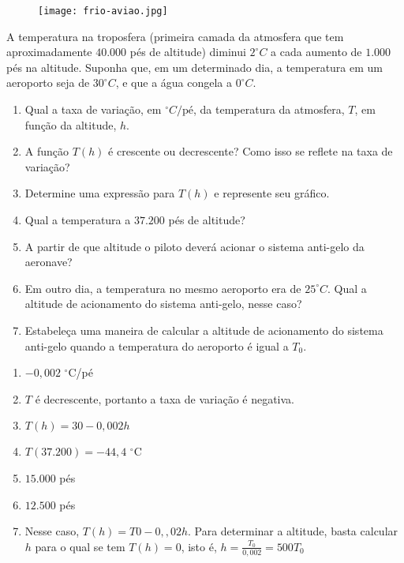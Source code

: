 \documentclass[10 pt,usenames,dvipsnames, oneside]{article}
\begin{document}
\begin{figure}[H]
\centering

\noindent\texttt{[image: frio-aviao.jpg]}
\end{figure}

A temperatura na troposfera (primeira camada da atmosfera que tem aproximadamente \(40.000\) pés de altitude) diminui \(2^\circ C\) a cada aumento de \(1.000\) pés na altitude. Suponha que, em um determinado dia, a temperatura em um aeroporto seja de \(30^\circ C\), e que a água congela a \(0^\circ C\).
\begin{enumerate}
\item {} 
Qual a taxa de variação, em \(^\circ C/\text{pé}\), da temperatura da atmosfera, \(T\), em função da altitude, \(h\).

\item {} 
A função \(T(h)\) é crescente ou decrescente? Como isso se reflete na taxa de variação?

\item {} 
Determine uma expressão para \(T(h)\) e represente seu gráfico.

\item {} 
Qual a temperatura a \(37.200\) pés de altitude?

\item {} 
A partir de que altitude o piloto deverá acionar o sistema anti-gelo da aeronave?

\item {} 
Em outro dia, a temperatura no mesmo aeroporto era de \(25^\circ C\). Qual a altitude de acionamento do sistema anti-gelo, nesse caso?

\item {} 
Estabeleça uma maneira de calcular a altitude de acionamento do sistema anti-gelo quando a temperatura do aeroporto é igual a \(T_0\).

\end{enumerate}

\ifdefined\prof
\begin{solucao}
\begin{enumerate}

\item $−0{,}002$ $^{\circ}$C/pé
\item $T$ é decrescente, portanto a taxa de variação é negativa.
\item $T(h)=30−0{,}002h$
\item $T(37.200)=−44{,}4$ $^{\circ}$C
\item $15.000$ pés
\item $12.500$ pés
\item Nesse caso, $T(h)=T0−0,{,}02h$. Para determinar a altitude, basta calcular $h$ para o qual se tem $T(h)=0$, isto é, $h=\displaystyle\frac{T_0}{0{,}002}=500T_0$
\end{enumerate}
\end{solucao}
\fi
\end{document}
